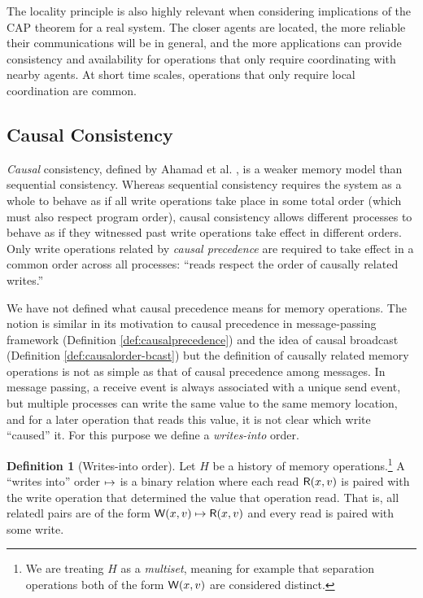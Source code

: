 \documentclass[]             %
{NASA}                       %
\theoremstyle{definition}
\newtheorem{definition}[theorem]{Definition}
\begin{document}
The locality principle is also highly relevant when considering
implications of the CAP theorem for a real system. The closer agents
are located, the more reliable their communications will be in
general, and the more applications can provide consistency and
availability for operations that only require coordinating with nearby
agents. At short time scales, operations that only require local
coordination are common.

\subsection{Causal Consistency}
\label{ssec:causal-memory}
\emph{Causal} consistency, defined by Ahamad et
al. \cite{1995:causal-memory}, is a weaker memory model than
sequential consistency. Whereas sequential consistency requires the
system as a whole to behave as if all write operations take place in
some total order (which must also respect program order), causal
consistency allows different processes to behave as if they witnessed
past write operations take effect in different orders. Only write
operations related by \emph{causal precedence} are required to take
effect in a common order across all processes: ``reads respect the
order of causally related writes.''  \cite{1995:causal-memory}

We have not defined what causal precedence means for memory
operations. The notion is similar in its motivation to causal
precedence in message-passing framework (Definition
\ref{def:causalprecedence}) and the idea of causal broadcast
(Definition \ref{def:causalorder-bcast}) but the definition of
causally related memory operations is not as simple as that of causal
precedence among messages. In message passing, a receive event is
always associated with a unique send event, but multiple processes can
write the same value to the same memory location, and for a later
operation that reads this value, it is not clear which write
``caused'' it. For this purpose we define a \emph{writes-into} order.

\begin{definition}[Writes-into order]
  Let $H$ be a history of memory operations.\footnote{We are treating
    $H$ as a \emph{multiset}, meaning for example that separation
    operations both of the form $\mathsf{W}\!\left(x, v\right)$ are considered
    distinct.} A ``writes into'' order $\mapsto$ is a binary
  relation where each read $\mathsf{R}\!\left(x, v\right)$ is paired with the
  write operation that determined the value that operation read. That
  is, all relatedl pairs are of the form
  $\mathsf{W}\!\left(x, v\right) \mapsto \mathsf{R}\!\left(x, v\right)$ and every read is
  paired with some write.
\end{definition}
\end{document}
